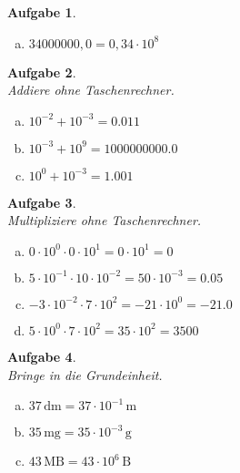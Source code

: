 \documentclass[12pt,fleqn]{article}
\theoremstyle{aufg}
\newtheorem{aufgabe}{Aufgabe}
\theoremstyle{bsp}
\begin{document}
\begin{flushleft}
\begin{aufgabe}
\begin{multicols}{3}
\begin{enumerate}[a)]
$2,6=0,026\cdot10^{2}$
\item 
$34000000,0=0,34\cdot10^{8}$
\end{enumerate} 
\end{multicols} 
\end{aufgabe} 
\begin{aufgabe} ~ \\ 
Addiere ohne Taschenrechner. \\ 
\begin{multicols}{3} 
\begin{enumerate}[a)] 
\item 
$10^{-2}+10^{-3}=0.011$
\item 
$10^{-3}+10^{9}=1000000000.0$
\item 
$10^{0}+10^{-3}=1.001$
\end{enumerate} 
\end{multicols} 
\end{aufgabe} 
\begin{aufgabe} ~ \\ 
Multipliziere ohne Taschenrechner. \\ 
\begin{multicols}{2} 
\begin{enumerate}[a)] 
\item 
$0\cdot10^{0}\cdot0\cdot10^{1}=$$0\cdot 10^{1}=$$0$
\item 
$5\cdot10^{-1}\cdot10\cdot10^{-2}=$$50\cdot 10^{-3}=$$0.05$
\item 
$-3\cdot10^{-2}\cdot7\cdot10^{2}=$$-21\cdot 10^{0}=$$-21.0$
\item 
$5\cdot10^{0}\cdot7\cdot10^{2}=$$35\cdot 10^{2}=$$3500$
\end{enumerate} 
\end{multicols} 
\end{aufgabe} 
\begin{aufgabe} ~ \\ 
Bringe in die Grundeinheit. \\ 
\begin{multicols}{3} 
\begin{enumerate}[a)] 
\item 
$37\,\mathrm{dm}=37\cdot 10^{-1} \,\mathrm{m^{}}$
\item 
$35\,\mathrm{mg}=35\cdot 10^{-3} \,\mathrm{g^{}}$
\item 
$43\,\mathrm{MB}=43\cdot 10^{6} \,\mathrm{B^{}}$
\end{enumerate} 
\end{multicols} 
\end{aufgabe} 

\end{flushleft}
\end{document}
